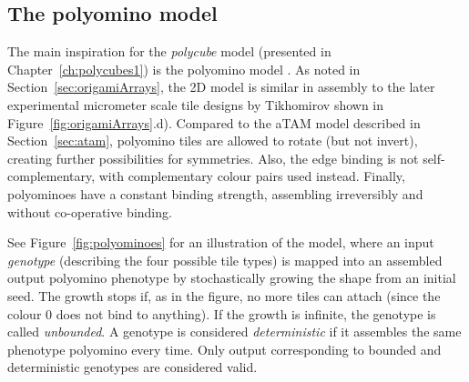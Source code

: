 \subsection{The polyomino model}\label{sec:polyomino}


The main inspiration for the \emph{polycube} model (presented in Chapter~\ref{ch:polycubes1}) is the polyomino model \cite{ahnert2010self, johnston2011evolutionary}. As noted in Section~\ref{sec:origamiArrays}, the 2D model is similar in assembly to the later experimental micrometer scale tile designs by Tikhomirov \cite{tikhomirov2017programmable} shown in Figure~\ref{fig:origamiArrays}.d). Compared to the aTAM model described in Section~\ref{sec:atam}, polyomino tiles are allowed to rotate (but not invert), creating further possibilities for symmetries. Also, the edge binding is not self-complementary, with complementary colour pairs used instead. Finally, polyominoes have a constant binding strength, assembling irreversibly and without co-operative binding.

See Figure~\ref{fig:polyominoes} for an illustration of the model, where an input \emph{genotype} (describing the four possible tile types) is mapped into an assembled output polyomino phenotype by stochastically growing the shape from an initial seed. The growth stops if, as in the figure, no more tiles can attach (since the colour \(0\) does not bind to anything). If the growth is infinite, the genotype is called \emph{unbounded}. A genotype is considered \emph{deterministic} if it assembles the same phenotype polyomino every time. Only output corresponding to bounded and deterministic genotypes are considered valid.

